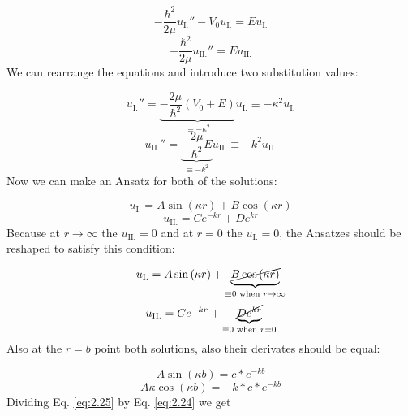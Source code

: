 \begin{equation} \label{eq:2.16}
	- \frac{\hbar^{2}}{2 \mu} u_{\text{I.}}'' - V_{0} u_{\text{I.}} = E u_{\text{I.}}
\end{equation}
\begin{equation} \label{eq:2.17}
	- \frac{\hbar^{2}}{2 \mu} u_{\text{II.}}'' = E u_{\text{II.}}
\end{equation}
We can rearrange the equations and introduce two substitution values:

\begin{equation} \label{eq:2.18}
	u_{\text{I.}}''
	=
	\underbrace{- \frac{2 \mu}{\hbar^{2}} \left( V_{0} + E \right)}_{\equiv -\kappa^{2}} u_{\text{I.}}
	\equiv
	- \kappa^{2} u_{\text{I.}}
\end{equation}
\begin{equation} \label{eq:2.19}
	u_{\text{II.}}''
	=
	\underbrace{- \frac{2 \mu}{\hbar^{2}} E}_{\equiv -k^{2}} u_{\text{II.}}
	\equiv
	- k^{2} u_{\text{II.}}
\end{equation}
Now we can make an Ansatz for both of the solutions:

\begin{equation} \label{eq:2.20}
	u_{\text{I.}}
	=
	A \sin \left( \kappa r \right)
	+
	B \cos \left( \kappa r \right)
\end{equation}
\begin{equation} \label{eq:2.21}
	u_{\text{II.}}
	=
	C e^{-kr}
	+
	D e^{kr}
\end{equation}
Because at $r \to \infty$ the $u_{\text{II.}} = 0$ and at $r = 0$ the $u_{\text{I.}} = 0$, the Ansatzes should be reshaped to satisfy this condition:

\begin{equation} \label{eq:2.22}
	u_{\text{I.}}
	=
	A \sin \left( \kappa r \right)
	+
	\underbrace{\cancel{B \cos \left( \kappa r \right)}}_{\equiv 0 \text{ when } r \to \infty}
\end{equation}
\begin{equation} \label{eq:2.23}
	u_{\text{II.}}
	=
	C e^{-kr}
	+
	\underbrace{\cancel{D e^{kr}}}_{\equiv 0 \text{ when } r = 0}
\end{equation}
Also at the $r=b$ point both solutions, also their derivates should be equal:

\begin{equation} \label{eq:2.24}
	A \sin \left( \kappa b \right)
	=
	c * e^{-kb}
\end{equation}
\begin{equation} \label{eq:2.25}
	A \kappa \cos \left( \kappa b \right)
	=
	- k * c * e^{-kb}
\end{equation}
Dividing Eq. \eqref{eq:2.25} by Eq. \eqref{eq:2.24} we get

